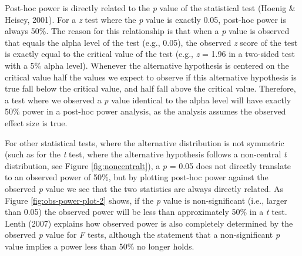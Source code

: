 \documentclass[
  english,
  ,jou,floatsintext]{apa6}
\begin{document}
Post-hoc power is directly related to the \emph{p} value of the statistical test (Hoenig \& Heisey, 2001). For a \emph{z} test where the \emph{p} value is exactly 0.05, post-hoc power is always 50\%. The reason for this relationship is that when a \emph{p} value is observed that equals the alpha level of the test (e.g., 0.05), the observed \emph{z} score of the test is exactly equal to the critical value of the test (e.g., \emph{z} = 1.96 in a two-sided test with a 5\% alpha level). Whenever the alternative hypothesis is centered on the critical value half the values we expect to observe if this alternative hypothesis is true fall below the critical value, and half fall above the critical value. Therefore, a test where we observed a \emph{p} value identical to the alpha level will have exactly 50\% power in a post-hoc power analysis, as the analysis assumes the observed effect size is true.

For other statistical tests, where the alternative distribution is not symmetric (such as for the \emph{t} test, where the alternative hypothesis follows a non-central \emph{t} distribution, see Figure \ref{fig:noncentralt}), a \emph{p} = 0.05 does not directly translate to an observed power of 50\%, but by plotting post-hoc power against the observed \emph{p} value we see that the two statistics are always directly related. As Figure \ref{fig:obs-power-plot-2} shows, if the \emph{p} value is non-significant (i.e., larger than 0.05) the observed power will be less than approximately 50\% in a \emph{t} test. Lenth (2007) explains how observed power is also completely determined by the observed \emph{p} value for \emph{F} tests, although the statement that a non-significant \emph{p} value implies a power less than 50\% no longer holds.
\end{document}
